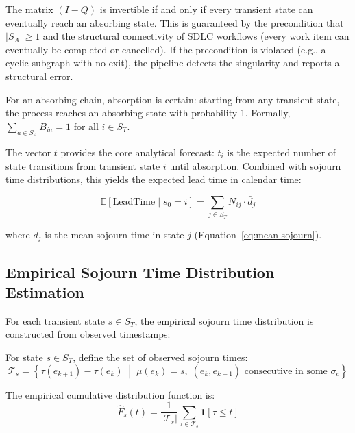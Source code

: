 \begin{property}[Invertibility]
\label{prop:invertibility}
The matrix $(I - Q)$ is invertible if and only if every transient state 
can eventually reach an absorbing state. This is guaranteed by the 
precondition that $|S_A| \geq 1$ and the structural connectivity of SDLC 
workflows (every work item can eventually be completed or cancelled). If 
the precondition is violated (e.g., a cyclic subgraph with no exit), the 
pipeline detects the singularity and reports a structural error.
\end{property}

\begin{property}
\label{prop:absorption-certainty}
For an absorbing chain, absorption is certain: starting from any transient 
state, the process reaches an absorbing state with probability 1. Formally, 
$\sum_{a \in S_A} B_{ia} = 1$ for all $i \in S_T$.
\end{property}

The vector $t$ provides the core analytical forecast: $t_i$ is the expected 
number of state transitions from transient state $i$ until absorption. 
Combined with sojourn time distributions, this yields the expected 
lead time in calendar time:

\begin{equation}
\label{eq:expected-lead-time}
\mathbb{E}[\text{LeadTime} \mid s_0 = i] = \sum_{j \in S_T} N_{ij} \cdot \bar{d}_j
\end{equation}

where $\bar{d}_j$ is the mean sojourn time in state $j$ 
(Equation~\ref{eq:mean-sojourn}).


\subsection{Empirical Sojourn Time Distribution Estimation}
\label{sec:s3-sojourn}

For each transient state $s \in S_T$, the empirical sojourn time 
distribution is constructed from observed timestamps:

\begin{definition}
\label{def:sojourn-distribution}
For state $s \in S_T$, define the set of observed sojourn times:
\begin{equation}
\label{eq:sojourn-obs}
\mathcal{T}_s = \left\{ \tau(e_{k+1}) - \tau(e_k) \;\middle|\; 
    \mu(e_k) = s, \; (e_k, e_{k+1}) \text{ consecutive in some } \sigma_c \right\}
\end{equation}

The empirical cumulative distribution function is:
\begin{equation}
\label{eq:ecdf}
\hat{F}_s(t) = \frac{1}{|\mathcal{T}_s|} \sum_{\tau \in \mathcal{T}_s} 
    \mathbf{1}[\tau \leq t]
\end{equation}
\end{definition}

